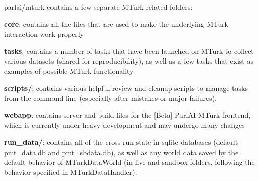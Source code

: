 {\ttfamily parlai/mturk} contains a few separate M\+Turk-\/related folders\+:


\begin{DoxyItemize}
\item {\bfseries core}\+: contains all the files that are used to make the underlying M\+Turk interaction work properly
\item {\bfseries tasks}\+: contains a number of tasks that have been launched on M\+Turk to collect various datasets (shared for reproducibility), as well as a few tasks that exist as examples of possible M\+Turk functionality
\item {\bfseries scripts/}\+: contains various helpful review and cleanup scripts to manage tasks from the command line (especially after mistakes or major failures).
\item {\bfseries webapp}\+: contains server and build files for the \mbox{[}Beta\mbox{]} Parl\+A\+I-\/\+M\+Turk frontend, which is currently under heavy development and may undergo many changes
\item {\bfseries run\+\_\+data/}\+: contains all of the cross-\/run state in sqlite databases (default {\ttfamily pmt\+\_\+data.\+db} and {\ttfamily pmt\+\_\+sbdata.\+db}), as well as any world data saved by the default behavior of {\ttfamily M\+Turk\+Data\+World} (in {\ttfamily live} and {\ttfamily sandbox} folders, following the behavior specified in {\ttfamily M\+Turk\+Data\+Handler}). 
\end{DoxyItemize}